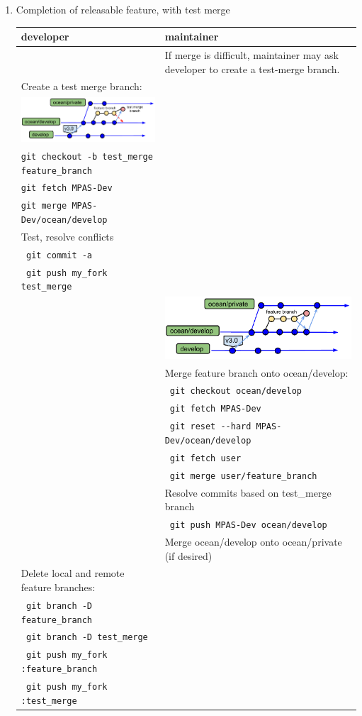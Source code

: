 \documentclass[11pt]{article}
\begin{document}
\begin{enumerate}
\clearpage
\item Completion of releasable feature, with test merge

\begin{centering}
\end{centering}
 \begin{tabular}[c]{L{3.3in}|L{3.3in}}
developer & maintainer \\
\hline
& If merge is difficult, maintainer may ask developer to create a test-merge branch.\\
Create a test merge branch: \\
\includegraphics[width=3.25in]{f/MPASworkflow_3d.pdf} \\
\verb|git checkout -b test_merge feature_branch|  \\
\verb|git fetch MPAS-Dev| \\ 
\verb|git merge MPAS-Dev/ocean/develop|  \\
Test, resolve conflicts \\
\verb| git commit -a|  \\
\verb| git push my_fork test_merge| \\
& \includegraphics[width=3.25in]{f/MPASworkflow_3.pdf} \\
& Merge feature branch onto ocean/develop: \\
& \verb| git checkout ocean/develop| \\
& \verb| git fetch MPAS-Dev| \\
& \verb| git reset --hard MPAS-Dev/ocean/develop | \\
& \verb| git fetch user| \\
& \verb| git merge user/feature_branch| \\
& Resolve commits based on test\_merge branch \\
& \verb| git push MPAS-Dev ocean/develop| \\
& Merge ocean/develop onto ocean/private (if desired)\\
Delete local and remote feature branches: \\
\verb| git branch -D feature_branch|  \\
\verb| git branch -D test_merge|  \\
\verb| git push my_fork :feature_branch| \\
\verb| git push my_fork :test_merge| \\
 \end{tabular}



\end{enumerate}
\end{document}

